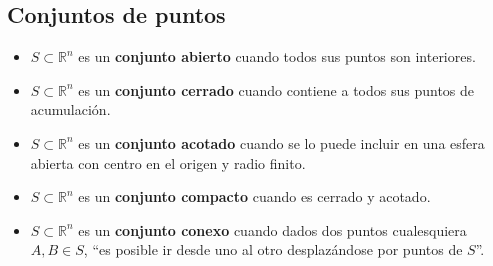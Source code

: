 \subsection*{Conjuntos de puntos}
\begin{itemize}
    \item $S \subset \mathbb{R}^n$ es un \textbf{conjunto abierto} cuando todos sus puntos son interiores.
    \item $S \subset \mathbb{R}^n$ es un \textbf{conjunto cerrado} cuando contiene a todos sus puntos de acumulación.
    \item $S \subset \mathbb{R}^n$ es un \textbf{conjunto acotado} cuando se lo puede incluir en una esfera abierta con centro en el origen y
radio finito.
    \item $S \subset \mathbb{R}^n$ es un \textbf{conjunto compacto} cuando es cerrado y acotado.
    \item $S \subset \mathbb{R}^n$ es un \textbf{conjunto conexo} cuando dados dos puntos cualesquiera $A,B \in S$, “es posible ir
desde uno al otro desplazándose por puntos de $S$”. 
\end{itemize}

